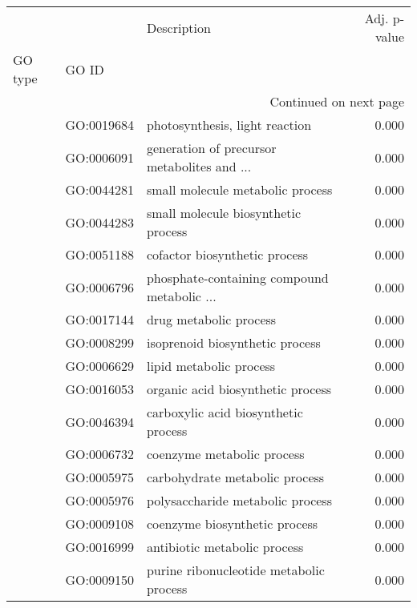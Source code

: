 \begin{longtable}{lllr}
\toprule
   &            &                                  Description &  Adj. p-value \\
GO type & GO ID &                                              &               \\
\midrule
\endhead
\midrule
\multicolumn{4}{r}{{Continued on next page}} \\
\midrule
\endfoot

\bottomrule
\endlastfoot
\multirow{174}{*}{BP} & GO:0019684 &               photosynthesis, light reaction &         0.000 \\
   & GO:0006091 &  generation of precursor metabolites and ... &         0.000 \\
   & GO:0044281 &             small molecule metabolic process &         0.000 \\
   & GO:0044283 &          small molecule biosynthetic process &         0.000 \\
   & GO:0051188 &                cofactor biosynthetic process &         0.000 \\
   & GO:0006796 &  phosphate-containing compound metabolic ... &         0.000 \\
   & GO:0017144 &                       drug metabolic process &         0.000 \\
   & GO:0008299 &              isoprenoid biosynthetic process &         0.000 \\
   & GO:0006629 &                      lipid metabolic process &         0.000 \\
   & GO:0016053 &            organic acid biosynthetic process &         0.000 \\
   & GO:0046394 &         carboxylic acid biosynthetic process &         0.000 \\
   & GO:0006732 &                   coenzyme metabolic process &         0.000 \\
   & GO:0005975 &               carbohydrate metabolic process &         0.000 \\
   & GO:0005976 &             polysaccharide metabolic process &         0.000 \\
   & GO:0009108 &                coenzyme biosynthetic process &         0.000 \\
   & GO:0016999 &                 antibiotic metabolic process &         0.000 \\
   & GO:0009150 &      purine ribonucleotide metabolic process &         0.000 \\

\end{longtable}
